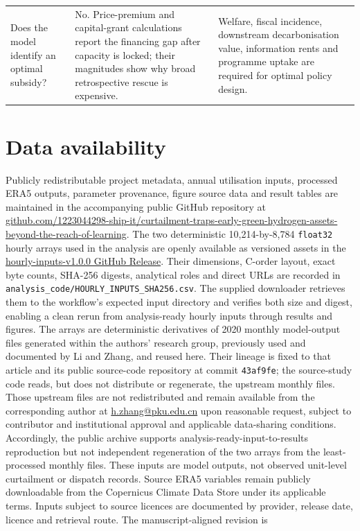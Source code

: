 \documentclass[pdflatex,sn-nature]{sn-jnl}
\begin{document}
\begin{longtable}{>{\raggedright\arraybackslash}p{}>{\raggedright\arraybackslash}p{}>{\raggedright\arraybackslash}p{}}
Does the model identify an optimal subsidy? & No. Price-premium and capital-grant calculations report the financing gap after capacity is locked; their magnitudes show why broad retrospective rescue is expensive. & Welfare, fiscal incidence, downstream decarbonisation value, information rents and programme uptake are required for optimal policy design. \\
\end{longtable}
\endgroup
\FloatBarrier

\section*{Data availability}

Publicly redistributable project metadata, annual utilisation inputs, processed ERA5 outputs, parameter provenance, figure source data and result tables are maintained in the accompanying public GitHub repository at \href{https://github.com/1223044298-ship-it/curtailment-traps-early-green-hydrogen-assets-beyond-the-reach-of-learning}{github.com/1223044298-ship-it/curtailment-traps-early-green-hydrogen-assets-beyond-the-reach-of-learning}. The two deterministic 10,214-by-8,784 \texttt{float32} hourly arrays used in the analysis are openly available as versioned assets in the \href{https://github.com/1223044298-ship-it/curtailment-traps-early-green-hydrogen-assets-beyond-the-reach-of-learning/releases/tag/hourly-inputs-v1.0.0}{hourly-inputs-v1.0.0 GitHub Release}. Their dimensions, C-order layout, exact byte counts, SHA-256 digests, analytical roles and direct URLs are recorded in \texttt{analysis\_code/HOURLY\_INPUTS\_SHA256.csv}. The supplied downloader retrieves them to the workflow's expected input directory and verifies both size and digest, enabling a clean rerun from analysis-ready hourly inputs through results and figures. The arrays are deterministic derivatives of 2020 monthly model-output files generated within the authors' research group, previously used and documented by Li and Zhang\cite{li2026}, and reused here. Their lineage is fixed to that article and its public source-code repository at commit \texttt{43af9fe}; the source-study code reads, but does not distribute or regenerate, the upstream monthly files. Those upstream files are not redistributed and remain available from the corresponding author at \href{mailto:h.zhang@pku.edu.cn}{h.zhang@pku.edu.cn} upon reasonable request, subject to contributor and institutional approval and applicable data-sharing conditions. Accordingly, the public archive supports analysis-ready-input-to-results reproduction but not independent regeneration of the two arrays from the least-processed monthly files. These inputs are model outputs, not observed unit-level curtailment or dispatch records. Source ERA5 variables remain publicly downloadable from the Copernicus Climate Data Store under its applicable terms. Inputs subject to source licences are documented by provider, release date, licence and retrieval route. The manuscript-aligned revision is 
\end{document}
